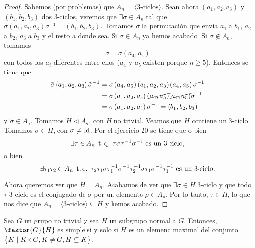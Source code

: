 \begin{proof}
    Sabemos (por problemas) que $A_n = \langle \text{3-ciclos}\rangle$. Sean ahora
    $\left( a_1, a_2, a_3 \right)$ y $\left( b_1, b_2, b_3 \right)$ dos 3-ciclos, veremos que
    $\exists \sigma \in A_n$ tal que
    $\sigma \left( a_1, a_2, a_3 \right) \sigma^{-1} = \left( b_1, b_2, b_3 \right)$. Tomamos
    $\sigma$ la permutación que envía $a_1$ a $b_1$, $a_2$ a $b_2$, $a_3$ a $b_3$ y el resto a donde sea.
    Si $\sigma \in A_n$ ya hemos acabado. Si $\sigma \notin A_n$, tomamos
    \[
        \tilde{\sigma} = \sigma \left( a_4, a_5 \right)
    \]
    con todos los $a_{i}$ diferentes entre ellos ($a_4$ y $a_5$ existen porque $n \geq 5$). Entonces se tiene que
    \[
        \begin{aligned}
            \tilde{\sigma} \left( a_1, a_2, a_3 \right) \tilde{\sigma}^{-1} &=
            \sigma \left( a_4, a_5 \right) \left( a_1, a_2, a_3 \right) \left( a_4, a_5 \right) \sigma^{-1} \\
            &= \sigma \left( a_1, a_2, a_3 \right) \cancel{\left( a_4, a_5 \right)}
            \cancel{\left( a_4, a_5 \right)} \sigma^{-1} \\
            &= \sigma\left( a_1, a_2, a_3 \right)\sigma^{-1} = \left( b_1, b_2, b_3 \right)
        \end{aligned}
    \]
    y $\tilde{\sigma} \in A_n$. Tomamos $H \triangleleft A_n$,  con $H$ no trivial. Veamos que $H$ contiene un 3-ciclo. Tomamos 
    $\sigma \in H$, con $\sigma \neq \operatorname{Id}$. Por el ejercicio 20 se tiene que o bien
    \[
            \exists \tau \in A_n \operatorname{\;t.q.\;} \tau \sigma \tau^{-1} \sigma^{-1} \text{ es un 3-ciclo},
    \]
    o bien
    \[
        \exists \tau_1 \tau_2 \in A_n \operatorname{\;t.q.\;} \tau_2 \tau_1\sigma\tau_1^{-1}\sigma^{-1}\tau_2^{-1}
            \sigma\tau_1\sigma^{-1}\tau_1^{-1} \text{ es un 3-ciclo}.
    \]

    \noindent Ahora queremos ver que $H = A_n$. Acabamos de ver que $\exists \sigma \in H$ 3-ciclo y que todo $\tau$ 3-ciclo es el conjugado de $\sigma$
    por un elemento $\rho\in A_n$. Por lo tanto, $\tau\in H$, lo que nos dice que $A_n=\langle\text{3-ciclos}\rangle \subseteq H$ y hemos acabado.
\end{proof}

\begin{lema}
    Sea $G$ un grupo no trivial y sea $H$ un subgrupo normal a $G$. Entonces, $\faktor{G}{H}$ es simple si y solo si $H$ es un elemeno maximal del conjunto $\left\{ K\mid K\triangleleft G, K\neq G, H\subseteq K\right\}$.
\end{lema}

